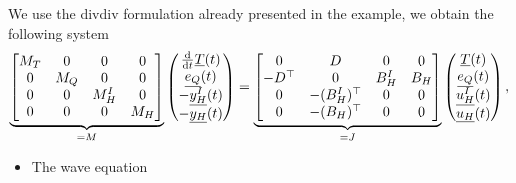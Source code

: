 \documentclass[letterpaper,10pt,english]{sphinxmanual}
\begin{document}
\sphinxAtStartPar
We use the div\sphinxhyphen{}div formulation already presented in the 
example,  we obtain the following system
\begin{equation*}
\begin{split}\underbrace{\begin{bmatrix}
M_T & 0 & 0 & 0 \\
0 & M_Q & 0 & 0 \\
0 & 0 & M^I_H & 0 \\
0 & 0 & 0 & M_H
\end{bmatrix}}_{= M}
\begin{pmatrix}
\frac{\rm d}{{\rm d}t} \underline{T}(t) \\
\underline{e_Q}(t) \\
-\underline{y^I_H}(t) \\
-\underline{y_H}(t)
\end{pmatrix}
=
\underbrace{\begin{bmatrix}
0 & D & 0 & 0 \\
-D^\top & 0 & B^I_H & B_H \\
0 & -(B^I_H)^\top & 0 & 0 \\
0 & -(B_H)^\top & 0 & 0
\end{bmatrix}}_{= J}
\begin{pmatrix}
\underline{T}(t) \\
\underline{e_Q}(t) \\
\underline{u^I_H}(t) \\
\underline{u_H}(t)
\end{pmatrix},\end{split}
\end{equation*}\begin{itemize}
\item {} 
\sphinxAtStartPar
The wave equation

\end{itemize}
\end{document}
